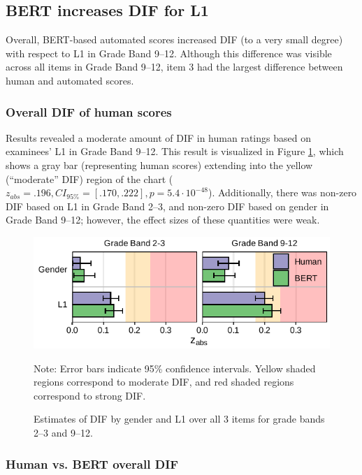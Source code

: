\documentclass [PhD] {uclathes}
\begin{document}
\subsection{BERT increases DIF for L1}
\label{res_rq1}

Overall, BERT-based automated scores increased DIF (to a very small degree) with respect to L1 in Grade Band 9–12. Although this difference was visible across all items in Grade Band 9–12, item 3 had the largest difference between human and automated scores. 

\subsubsection{Overall DIF of human scores}

Results revealed a moderate amount of DIF in human ratings based on examinees’ L1 in Grade Band 9–12. This result is visualized in Figure \ref{fig:zabs_ovr}, which shows a gray bar (representing human scores) extending into the yellow (“moderate” DIF) region of the chart ($z_{abs} = .196, CI_{95\%} = [.170, .222], p = 5.4 \cdot 10^{-48}$). Additionally, there was non-zero DIF based on L1 in Grade Band 2–3, and non-zero DIF based on gender in Grade Band 9–12; however, the effect sizes of these quantities were weak.

\begin{figure}[h]
    \centering
    \caption{Estimates of DIF by gender and L1 over all 3 items for grade bands 2–3 and 9–12.}    
    \includegraphics[width=4.5in]{figures/20230504_ETS-DIF_BERT_zabs_ovr_edit.pdf}
    \label{fig:zabs_ovr}
	{\newline Note: Error bars indicate 95\% confidence intervals. Yellow shaded regions correspond to moderate DIF, and red shaded regions correspond to strong DIF. \par}
\end{figure}

\subsubsection{Human vs. BERT overall DIF}
\end{document}

